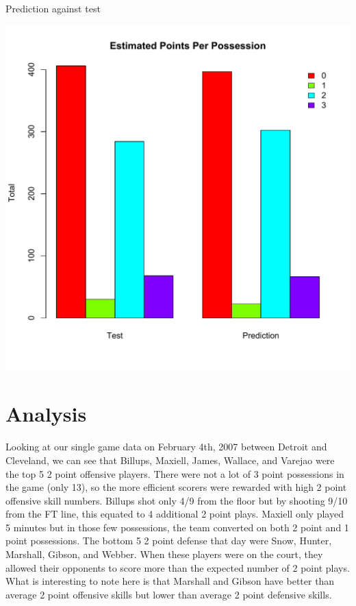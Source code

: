 \documentclass[10pt,twocolumn]{article}
\newcommand{\Elin}[1]{\ensuremath{     \mathrm{E}\left[ #1 \right]   }}
\begin{document}
Prediction against test
\begin{center}
	\includegraphics[width=0.99\linewidth]{figures/Rplot}
\end{center}



\section{Analysis}



Looking at our single game data on February 4th, 2007 between Detroit and Cleveland, we can see that Billups, Maxiell, James, Wallace, and Varejao were the top 5 2 point offensive players. There were not a lot of 3 point possessions in the game (only 13), so the more efficient scorers were rewarded with high 2 point offensive skill numbers. Billups shot only 4/9 from the floor but by shooting 9/10 from the FT line, this equated to 4 additional 2 point plays. Maxiell only played 5 minutes but in those few possessions, the team converted on both 2 point and 1 point possessions. The bottom 5 2 point defense that day were Snow, Hunter, Marshall, Gibson, and Webber. When these players were on the court, they allowed their opponents to score more than the expected number of 2 point plays. What is interesting to note here is that Marshall and Gibson have better than average 2 point offensive skills but lower than average 2 point defensive skills. 
\end{document}
